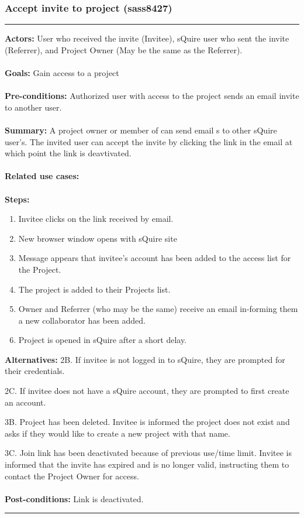 \documentclass[11pt]{report}
\begin{document}
\subsubsection{Accept invite to project (sass8427)}
\vspace{2pt}
\hrule
\vspace{8pt}
 \textbf{Actors:} User who received the invite (Invitee), sQuire user who sent the invite (Referrer), and Project Owner (May be the same as the Referrer).  \\ \\
\textbf{Goals:} Gain access to a project \\ \\
 \textbf{Pre-conditions:} Authorized user with access to the project sends an email invite to another user.   \\ \\
\textbf{Summary:} A project owner or member of can send email s to other sQuire user's. The invited user can accept the invite by clicking the link in the email at which point the link is deavtivated. \\ \\
\textbf{Related use cases:} \\ \\
\textbf{Steps:} \begin{enumerate}
  \item Invitee clicks on the link received by email. 
  \item New browser window opens with sQuire site
  \item Message appears that invitee's account has been added to the access list for the Project.
  \item The project is added to their Projects list.
  \item Owner and Referrer (who may be the same) receive an email in-forming them a new collaborator has been added.
  \item Project is opened in sQuire after a short delay.
 \end{enumerate}
 \textbf{Alternatives:} 2B. If invitee is not logged in to sQuire, they are prompted for their credentials.
 
	2C. If invitee does not have a sQuire account, they are prompted to first create an account.
	
	3B. Project has been deleted. Invitee is informed the project does not exist and asks if they would like to create a new project with that name.
	
	3C. Join link has been deactivated because of previous use/time limit. Invitee is informed that the invite has expired and is no longer valid, instructing them to contact the Project Owner for access. \\ \\
 \textbf{Post-conditions:} Link is deactivated.  \\
\vspace{8pt}
\hrule
\newpage
\end{document}
